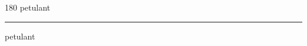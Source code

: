 
\begin{frame}
\begin{center}
\begin{turn}{180}
{\fontsize{2.5cm}{1em}\selectfont petulant}
\end{turn}
\vspace{1em}\par  
\hrule
\vspace{1em}\par  
{\fontsize{2.5cm}{1em}\selectfont petulant}
\end{center}
\end{frame}
